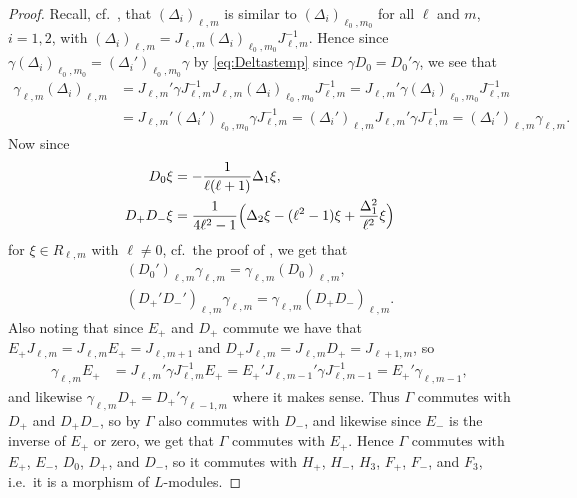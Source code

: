 \begin{proof}
  Recall, cf.\ , that $(\Delta_i)_{\ell,m}$ is similar to $(\Delta_i)_{\ell_0,m_0}$ for all $\ell$ and $m$, $i=1,2$, with $(\Delta_i)_{\ell,m} = J_{\ell,m}(\Delta_i)_{\ell_0,m_0}J_{\ell,m}^{-1}$. Hence since $\gamma (\Delta_i)_{\ell_0,m_0} = (\Delta_i')_{\ell_0,m_0}\gamma$ by \cref{eq:Deltastemp} since $\gamma D_0 = D_0' \gamma$, we see that
  \begin{align*}
    \gamma_{\ell,m} (\Delta_i)_{\ell,m} &= J_{\ell,m}' \gamma J_{\ell,m}^{-1}J_{\ell,m}(\Delta_i)_{\ell_0,m_0}J_{\ell,m}^{-1} = J_{\ell,m}' \gamma (\Delta_i)_{\ell_0,m_0}J_{\ell,m}^{-1} \\
    &= J_{\ell,m}' (\Delta_i')_{\ell_0,m_0} \gamma J_{\ell,m}^{-1} = (\Delta_i')_{\ell,m} J_{\ell,m}'\gamma J_{\ell,m}^{-1} = (\Delta_i')_{\ell,m} \gamma_{\ell,m}.
  \end{align*}
  Now since
  \begin{align*}
    D_0 \xi &= -\dfrac{1}{\ell(\ell+1)} \Delta_1\xi,\\
    D_+D_- \xi &= \dfrac{1}{4\ell^2-1}\Bigl( \Delta_2\xi - (\ell^2-1)\xi + \dfrac{\Delta_1^2}{\ell^2}\xi \Bigr)
  \end{align*}
  for $\xi \in R_{\ell,m}$ with $\ell\neq 0$, cf.\ the proof of , we get that
  \begin{align*}
    (D_0')_{\ell,m}\gamma_{\ell,m} = \gamma_{\ell,m}(D_0)_{\ell,m},\\
    (D_+'D_-')_{\ell,m}\gamma_{\ell,m} = \gamma_{\ell,m} (D_+D_-)_{\ell,m}.
  \end{align*}
  Also noting that since $E_+$ and $D_+$ commute we have that $E_+J_{\ell,m}=J_{\ell,m}E_+=J_{\ell,m+1}$ and $D_+J_{\ell,m}=J_{\ell,m}D_+=J_{\ell+1,m}$, so
  \begin{align*}
    \gamma_{\ell,m} E_+ &= J_{\ell,m}' \gamma J_{\ell,m}^{-1} E_+ = E_+'J_{\ell,m-1}' \gamma J_{\ell,m-1}^{-1} = E_+'\gamma_{\ell,m-1},
  \end{align*}
  and likewise $\gamma_{\ell,m}D_+ = D_+'\gamma_{\ell-1,m}$ where it makes sense. Thus $\Gamma$ commutes with $D_+$ and $D_+D_-$, so by  $\Gamma$ also commutes with $D_-$, and likewise since $E_-$ is the inverse of $E_+$ or zero, we get that $\Gamma$ commutes with $E_+$. Hence $\Gamma$ commutes with $E_+$, $E_-$, $D_0$, $D_+$, and $D_-$, so it commutes with $H_+$, $H_-$, $H_3$, $F_+$, $F_-$, and $F_3$, i.e.\ it is a morphism of $L$-modules. 
\end{proof}

